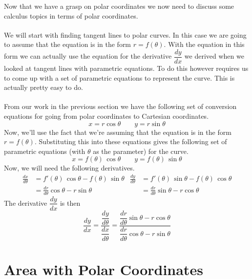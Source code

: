 \documentclass[10pt,reqno]{book}
\theoremstyle{definition}
\begin{document}
	Now that we have a grasp on polar coordinates we now need to discuss some calculus topics in terms of polar coordinates. \\ \\
	We will start with finding tangent lines to polar curves. In this case we are going to assume that the equation is in the form $ r = f(\theta) $. With the equation in this form we can actually use the equation for the derivative $ \dfrac{dy}{dx} $ we derived when we looked at tangent lines with parametric equations. To do this however requires us to come up with a set of parametric equations to represent the curve. This is actually pretty easy to do.\\ \\
	From our work in the previous section we have the following set of conversion equations for going from polar coordinates to Cartesian coordinates.
	\[ x = r\cos\theta \qquad y = r\sin\theta \]
	Now, we'll use the fact that we're assuming that the equation is in the form $ r = f(\theta) $. Substituting this into these equations gives the following set of parametric equations (with $ \theta $ as the parameter) for the curve.
	\[ x = f(\theta)\,\cos\theta \qquad y = f(\theta)\,\sin\theta \]
	Now, we will need the following derivatives.
	\begin{align*}
		\frac{dx}{d\theta} & = f'(\theta)\,\cos\theta - f(\theta)\,\sin\theta & \frac{dy}{d\theta} & = f'(\theta)\,\sin\theta - f(\theta)\,\cos\theta \\
		                   & = \frac{dr}{d\theta} \cos\theta - r\sin\theta    &                    & = \frac{dr}{d\theta} \sin\theta - r\cos\theta
	\end{align*}
	The derivative $ \dfrac{dy}{dx} $ is then
	\[ \frac{dy}{dx} = \frac{\dfrac{dy}{d\theta}}{\dfrac{dx}{d\theta}} = \frac{\dfrac{dr}{d\theta} \sin\theta - r\cos\theta}{\dfrac{dr}{d\theta} \cos\theta - r\sin\theta} \]
	
	
	\section{Area with Polar Coordinates}
	
\end{document}
